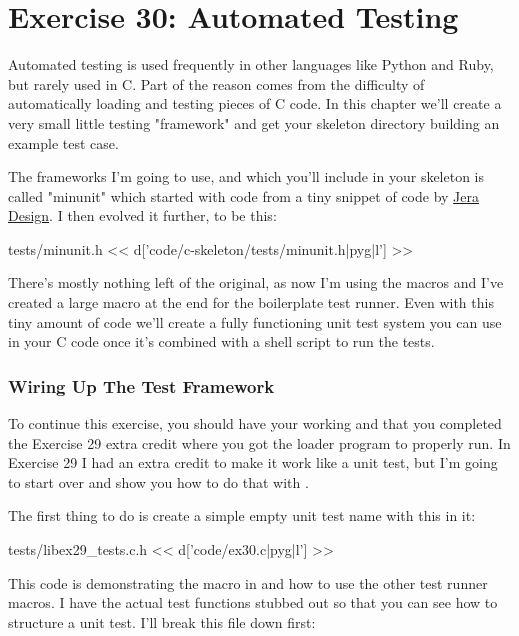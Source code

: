 \chapter{Exercise 30: Automated Testing}

Automated testing is used frequently in other languages like Python and Ruby, but
rarely used in C.  Part of the reason comes from the difficulty of automatically
loading and testing pieces of C code.  In this chapter we'll create a very small
little testing "framework" and get your skeleton directory building an example
test case.

The frameworks I'm going to use, and which you'll include in your 
skeleton is called "minunit" which started with code from a tiny snippet
of code by \href{http://www.jera.com/techinfo/jtns/jtn002.html}{Jera Design}.  I then
evolved it further, to be this:

\begin{code}{tests/minunit.h}
<< d['code/c-skeleton/tests/minunit.h|pyg|l'] >>
\end{code}

There's mostly nothing left of the original, as now I'm using the  
macros and I've created a large macro at the end for the boilerplate test
runner.  Even with this tiny amount of code we'll create a fully functioning
unit test system you can use in your C code once it's combined with a 
shell script to run the tests.

\subsection{Wiring Up The Test Framework}

To continue this exercise, you should have your  working
and that you completed the Exercise 29 extra credit where you got the 
 loader program to properly run.  In Exercise 29 I had
an extra credit to make it work like a unit test, but I'm going to start
over and show you how to do that with .

The first thing to do is create a simple empty unit test name  with this in it:

\begin{code}{tests/libex29\_tests.c.h}
<< d['code/ex30.c|pyg|l'] >>
\end{code}

This code is demonstrating the  macro in 
and how to use the other test runner macros.  I have the actual test functions
stubbed out so that you can see how to structure a unit test.  I'll break
this file down first:

